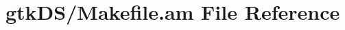 \hypertarget{gtk_d_s_2_makefile_8am}{}\section{gtk\+D\+S/\+Makefile.am File Reference}
\label{gtk_d_s_2_makefile_8am}

